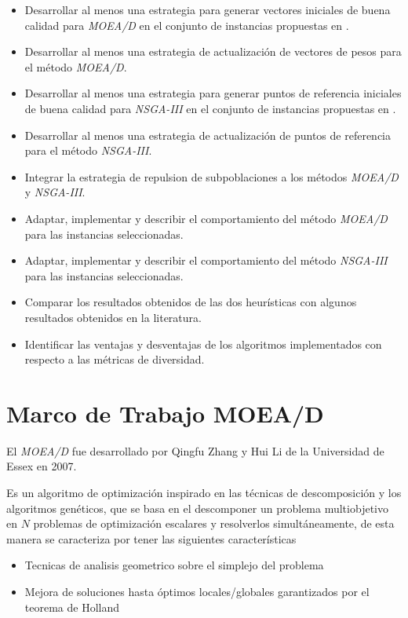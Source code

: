 \documentclass[letterpaper,10pt]{article}
\begin{document}
\begin{itemize}
\item Desarrollar al menos una estrategia para generar vectores iniciales de buena calidad para \emph{MOEA/D} en el conjunto de instancias propuestas en \cite{zhang2008multiobjective}.

\item Desarrollar al menos una estrategia de actualización de vectores de pesos para el método \emph{MOEA/D}.

\item Desarrollar al menos una estrategia para generar puntos de referencia iniciales de buena calidad para \emph{NSGA-III} en el conjunto de instancias propuestas en \cite{zhang2008multiobjective}.

\item Desarrollar al menos una estrategia de actualización de puntos de referencia para el método \emph{NSGA-III}.

\item Integrar la estrategia de repulsion de subpoblaciones\cite{ahrari2016multimodal} a los métodos \emph{MOEA/D} y \emph{NSGA-III}.

\item Adaptar, implementar y describir el comportamiento del método \emph{MOEA/D} para las instancias seleccionadas.
 
\item Adaptar, implementar y describir el comportamiento del método \emph{NSGA-III} para las instancias seleccionadas.

\item Comparar los resultados obtenidos de las dos heurísticas con algunos resultados obtenidos en la literatura.

\item Identificar las ventajas y desventajas de los algoritmos implementados con respecto a las métricas de diversidad.
\end{itemize}

\section{Marco de Trabajo MOEA/D}
El \emph{MOEA/D} fue desarrollado por Qingfu Zhang y Hui Li de la Universidad de Essex en 2007. \cite{4358754}
 
Es un algoritmo de optimización inspirado en las técnicas de descomposición y los algoritmos genéticos, que se basa en el descomponer un problema multiobjetivo en $N$ problemas de optimización escalares y resolverlos simultáneamente, de esta manera se caracteriza por tener las siguientes características
 \begin{itemize}
 \item Tecnicas de analisis geometrico sobre el simplejo del problema \cite{mie99,Das:1998:NIN:588907.589322, Messac2003}
 \item Mejora de soluciones hasta óptimos locales/globales garantizados por el teorema de Holland\cite{Holland:1992:ANA:531075}
 \end{itemize}
 
\end{document}
